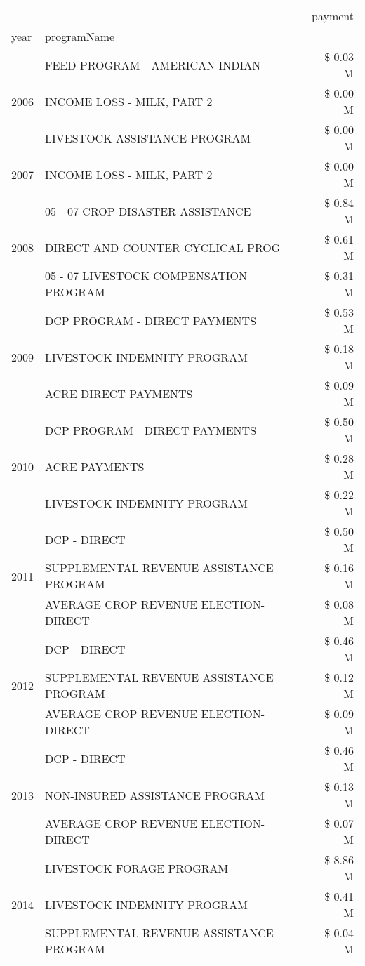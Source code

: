 \begin{tabular}{llr}
\toprule
 &  & payment \\
year & programName &  \\
\midrule
\multirow[t]{3}{*}{2006} & FEED PROGRAM - AMERICAN INDIAN & \$ 0.03 M \\
 & INCOME LOSS - MILK, PART 2 & \$ 0.00 M \\
 & LIVESTOCK ASSISTANCE PROGRAM & \$ 0.00 M \\
\cline{1-3}
2007 & INCOME LOSS - MILK, PART 2 & \$ 0.00 M \\
\cline{1-3}
\multirow[t]{3}{*}{2008} & 05 - 07 CROP DISASTER ASSISTANCE & \$ 0.84 M \\
 & DIRECT AND COUNTER CYCLICAL PROG & \$ 0.61 M \\
 & 05 - 07 LIVESTOCK COMPENSATION PROGRAM & \$ 0.31 M \\
\cline{1-3}
\multirow[t]{3}{*}{2009} & DCP PROGRAM - DIRECT PAYMENTS & \$ 0.53 M \\
 & LIVESTOCK INDEMNITY PROGRAM & \$ 0.18 M \\
 & ACRE DIRECT PAYMENTS & \$ 0.09 M \\
\cline{1-3}
\multirow[t]{3}{*}{2010} & DCP PROGRAM - DIRECT PAYMENTS & \$ 0.50 M \\
 & ACRE PAYMENTS & \$ 0.28 M \\
 & LIVESTOCK INDEMNITY PROGRAM & \$ 0.22 M \\
\cline{1-3}
\multirow[t]{3}{*}{2011} & DCP - DIRECT & \$ 0.50 M \\
 & SUPPLEMENTAL REVENUE ASSISTANCE PROGRAM & \$ 0.16 M \\
 & AVERAGE CROP REVENUE ELECTION-DIRECT & \$ 0.08 M \\
\cline{1-3}
\multirow[t]{3}{*}{2012} & DCP - DIRECT & \$ 0.46 M \\
 & SUPPLEMENTAL REVENUE ASSISTANCE PROGRAM & \$ 0.12 M \\
 & AVERAGE CROP REVENUE ELECTION-DIRECT & \$ 0.09 M \\
\cline{1-3}
\multirow[t]{3}{*}{2013} & DCP - DIRECT & \$ 0.46 M \\
 & NON-INSURED ASSISTANCE PROGRAM & \$ 0.13 M \\
 & AVERAGE CROP REVENUE ELECTION-DIRECT & \$ 0.07 M \\
\cline{1-3}
\multirow[t]{3}{*}{2014} & LIVESTOCK FORAGE PROGRAM & \$ 8.86 M \\
 & LIVESTOCK INDEMNITY PROGRAM & \$ 0.41 M \\
 & SUPPLEMENTAL REVENUE ASSISTANCE PROGRAM & \$ 0.04 M \\

\end{tabular}
